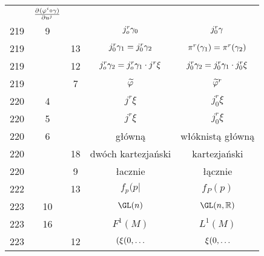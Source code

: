\documentclass[a4paper,11pt]{article}
\begin{document}
\begin{center}
\begin{tabular}{|c|c|c|c|c|}
           & $\frac{ \partial^{  } {  ( { \varphi^{ i } } \circ \gamma )  } }{ \partial {  { u^{ j } }  }^{  } }$ \\
    219 &  9 & & $j_{ o }^{ r } \gamma_{ 0 }$ & $j_{ 0 }^{ r } \gamma$ \\
    219 & & 13 & $j_{ 0 }^{ r } \gamma_{ 1 } = j_{ 0 }^{ r } \gamma_{ 2 }$
           & $\pi^{ r } ( \gamma_{ 1 } ) = \pi^{ r }( \gamma_{ 2 } )$ \\
    219 & & 12 & $j^{ r }_{ o } \gamma_{ 2 } = j^{ r }_{ o } \gamma_{ 1 }
                 \cdot j^{ r } \xi$
           & $j^{ r }_{ 0 } \gamma_{ 2 } = j^{ r }_{ 0 } \gamma_{ 1 } \cdot
             j^{ r }_{ 0 } \xi$ \\
    219 & &  7 & $\widetilde{ \varphi }$ & $\widetilde{ \varphi }^{ r }$ \\
    220 &  4 & & $j^{ r } \xi$ & $j^{ r }_{ 0 } \xi$ \\
    220 &  5 & & $j^{ r } \xi$ & $j^{ r }_{ 0 } \xi$ \\
    220 &  6 & & główną & włóknistą główną \\
    220 & & 18 & dwóch kartezjański & kartezjański \\
    220 & &  9 & łacznie & łącznie \\
    222 & & 13 & $f_{ p }( p |$ & $f_{ P }( p )$ \\
    223 & 10 & & $\GL( n )$ & $\GL( n ,\R )$ \\
    223 & 16 & & $F^{ 1 }( M )$ & $L^{ 1 }( M )$ \\
    223 & & 12 & $( \xi( 0, \ldots$ & $\xi( 0, \ldots$ \\
    \hline
  \end{tabular}


\end{center}
\end{document}
